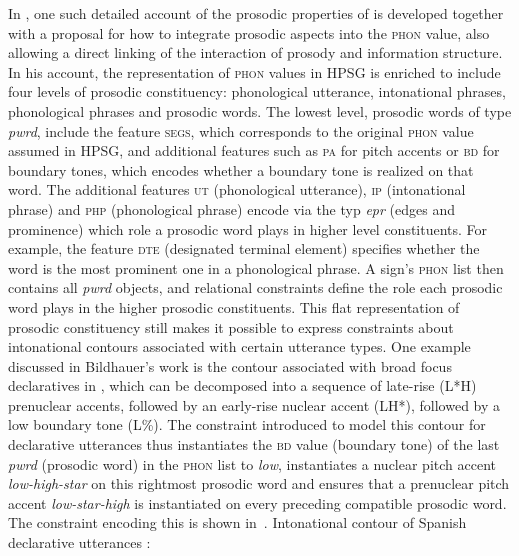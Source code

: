 \documentclass[output=paper
                ,modfonts
                ,nonflat
	        ,collection
	        ,collectionchapter
	        ,collectiontoclongg
 	        ,biblatex
                ,babelshorthands
                ,newtxmath
                ,draftmode
                ,colorlinks, citecolor=brown
]{./langsci/langscibook}
\begin{document}
In \cite{Bildhauer2008a}, one such detailed account of the prosodic
properties of  is developed together with a proposal for how to
integrate prosodic aspects into the \textsc{phon} value, also allowing
a direct linking of the interaction of prosody and information
structure.  In his account, the representation of \textsc{phon} values
in HPSG is enriched to include four levels of prosodic constituency:
phonological utterance, intonational phrases, phonological
phrases and prosodic words. The lowest level, prosodic words of type
\textit{pwrd}, include the feature \textsc{segs}, which corresponds to
the original \textsc{phon} value assumed in HPSG, and additional
features such as \textsc{pa} for pitch accents or \textsc{bd} for
boundary tones, which encodes whether a boundary tone is realized on that
word. The additional features \textsc{ut} (phonological utterance),
\textsc{ip} (intonational phrase) and \textsc{php} (phonological phrase)
encode via the typ \textit{epr} (edges and prominence) which role
a prosodic word plays in higher level constituents. For example, the
feature \textsc{dte} (designated terminal element) specifies whether
the word is the most prominent one in a phonological phrase. A sign's
\textsc{phon} list then contains all \textit{pwrd} objects, and
relational constraints define the role each prosodic word plays in
the higher prosodic constituents. This flat representation of prosodic
constituency still makes it possible to express constraints about intonational
contours associated with certain utterance types. One example
discussed in Bildhauer's work is the contour associated with broad
focus declaratives in , which can be decomposed into a
sequence of late-rise (L*H) prenuclear accents, followed by an
early-rise nuclear accent (LH*), followed by a low boundary tone
(L\%). The constraint introduced to model this contour for declarative
utterances thus instantiates the \textsc{bd} value (boundary tone) of
the last \textit{pwrd} (prosodic word) in the \textsc{phon} list to \textit{low}, instantiates
a nuclear pitch accent \textit{low-high-star} on this rightmost
prosodic word and ensures that a prenuclear pitch accent
\textit{low-star-high} is instantiated on every preceding compatible
prosodic word. The constraint encoding this is shown in~.
\ea
Intonational contour of Spanish declarative utterances \citep[142]{Bildhauer2008a}:\\
\end{document}
